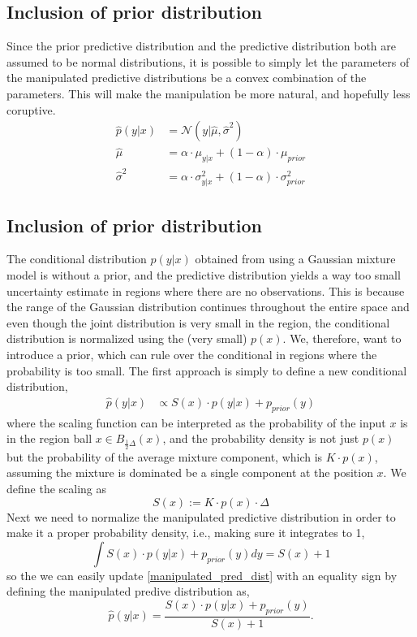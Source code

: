 \subsection{Inclusion of prior distribution}
Since the prior predictive distribution and the predictive distribution both are assumed to be normal distributions, 
it is possible to simply let the parameters of the manipulated predictive distributions be a convex combination of the 
parameters. This will make the manipulation be more natural, and hopefully less coruptive. 
\begin{align*}
    \hat p (y|x) &=\mathcal{N}(y| \hat \mu, \hat\sigma^2)\\
    \hat \mu &= \alpha \cdot \mu_{y|x} + (1-\alpha) \cdot \mu_{prior}\\
    \hat \sigma^2 &= \alpha \cdot \sigma_{y|x}^2 + (1-\alpha) \cdot\sigma_{prior}^2
\end{align*}


\subsection{Inclusion of prior distribution}
The conditional distribution $p(y|x)$ obtained from using a Gaussian mixture model is without a prior, and
the predictive distribution yields a way too small uncertainty estimate in regions where there are no observations.
This is because the range of the Gaussian distribution continues throughout the entire space and even though the
joint distribution is very small in the region, the conditional distribution is normalized using the (very small) $p(x)$.
We, therefore, want to introduce a prior, which can rule over the conditional in regions where the probability is too
small. The first approach is simply to define a new conditional distribution, 
\begin{align}\label{manipulated_pred_dist}
    \hat p(y|x) &\propto S(x) \cdot p(y|x) + p_{prior}(y)
\end{align}
where the scaling function can be interpreted as the probability of the input $x$ is in the region
ball $x \in B_{\frac{1}{2}\Delta}(x)$, and the probability density is not just $p(x)$ but the
probability of the average mixture component, which is $K\cdot p(x)$, assuming the mixture is
dominated be a single component at the position $x$. We define the scaling as 
$$S(x):= K\cdot p(x)\cdot \Delta$$
Next we need to normalize the manipulated predictive distribution in order to
make it a proper probability density, i.e., making sure it integrates to 1, 
$$\int S(x) \cdot p(y|x) + p_{prior}(y) dy =S(x)+1$$
so the we can easily update \eqref{manipulated_pred_dist} with an equality
sign by defining the manipulated predive distribution as, 
$$\hat p(y|x) = \frac{S(x) \cdot p(y|x) + p_{prior}(y)}{S(x)+1}.$$

